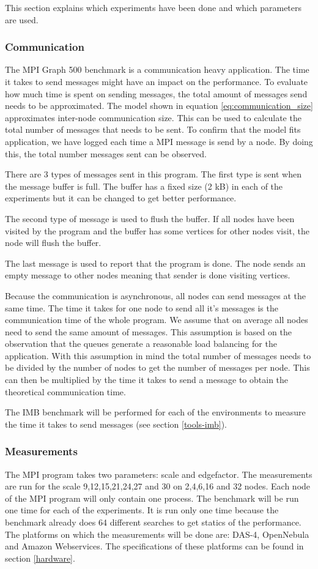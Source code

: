 This section explains which experiments have been done and which parameters are used.

\subsubsection{Communication}
\label{med:comm}
The MPI Graph 500 benchmark is a communication heavy application. The time it takes to send messages might have an impact on the performance. To evaluate how much time is spent on sending messages, the total amount of messages send needs to be approximated. The model shown in equation \ref{eq:communication_size} approximates inter-node communication size. This can be used to calculate the total number of messages that needs to be sent. To confirm that the model fits application, we have logged each time a MPI message is send by a node. By doing this, the total number messages sent can be observed. 

There are 3 types of messages sent in this program. The first type is sent when the message buffer is full. The buffer has a fixed size (2 kB) in each of the experiments but it can be changed to get better performance. 

The second type of message is used to flush the buffer. If all nodes have been visited by the program and the buffer has some vertices for other nodes visit, the node will flush the buffer.

The last message is used to report that the program is done. The node sends an empty message to other nodes meaning that sender is done visiting vertices.

Because the communication is asynchronous, all nodes can send messages at the same time. The time it takes for one node to send all it's messages is the communication time of the whole program. We assume that on average all nodes need to send the same amount of messages. This assumption is based on the observation that the queues generate a reasonable load balancing for the application. With this assumption in mind the total number of messages needs to be divided by the number of nodes to get the number of messages per node. This can then be multiplied by the time it takes to send a message to obtain the theoretical communication time.  

The IMB benchmark will be performed for each of the environments to measure the time it takes to send messages (see section \ref{tools-imb}).


\subsubsection{Measurements}
The MPI program takes two parameters: scale and edgefactor. The measurements are run for the scale 9,12,15,21,24,27 and 30 on 2,4,6,16 and 32 nodes. Each node of the MPI program will only contain one process. The benchmark will be run one time for each of the experiments. It is run only one time because the benchmark already does 64 different searches to get statics of the performance. The platforms on which the measurements will be done are: DAS-4, OpenNebula and Amazon Webservices. The specifications of these platforms can be found in section \ref{hardware}.

